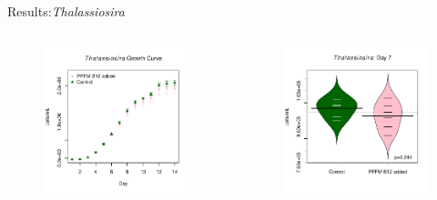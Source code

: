 \documentclass[8pt]{beamer}\usepackage[]{graphicx}\usepackage[]{color}
\begin{document}
\begin{frame}{Results:{\it Thalassiosira}}
\begin{columns}[t] %
                \begin{figure}
                                \includegraphics[width=1\textwidth]{./figure/Thalassiosira_Scatter_with_SD_errors.pdf}
                                \end{figure}
                                \begin{figure}
                                \includegraphics[width=1\textwidth]{./figure/Thalassiosira_beanopplot.pdf}

\end{figure}
\end{columns}
\end{frame}
\end{document}

